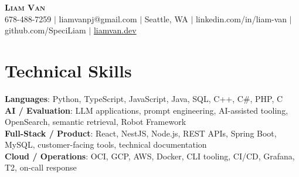 \documentclass[letterpaper,11pt]{article}
\begin{document}

%
\begin{center}
    \textbf{\Huge \scshape Liam Van} \\ \vspace{1pt}
    \small 678-488-7259 $|$ \small {liamvanpj@gmail.com} $|$ Seattle, WA
 {{$|$ linkedin.com/in/liam-van} {$|$ github.com/SpeciLiam} {$|$ \href{https://liamvan.dev}{liamvan.dev}}}

\end{center}

\section{Technical Skills}
 \begin{itemize}[leftmargin=0.15in, label={}]
    \small{\item{
     \textbf{Languages}{: Python, TypeScript, JavaScript, Java, SQL, C++, C\#, PHP, C} \\
     \textbf{AI / Evaluation}{: LLM applications, prompt engineering, AI-assisted tooling, OpenSearch, semantic retrieval, Robot Framework} \\
     \textbf{Full-Stack / Product}{: React, NestJS, Node.js, REST APIs, Spring Boot, MySQL, customer-facing tools, technical documentation} \\
     \textbf{Cloud / Operations}{: OCI, GCP, AWS, Docker, CLI tooling, CI/CD, Grafana, T2, on-call response} \\
    }}
 \end{itemize}
%
\end{document}
